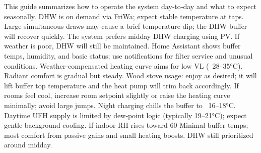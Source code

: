 \markdownRendererDocumentBegin
\markdownRendererSectionBegin
{}\markdownRendererInterblockSeparator
{}This guide summarizes how to operate the system day‑to‑day and what to expect seasonally.\markdownRendererInterblockSeparator
{}\markdownRendererSectionBegin
{}\markdownRendererInterblockSeparator
{}\markdownRendererUlBeginTight
\markdownRendererUlItem DHW is on demand via FriWa; expect stable temperature at taps. Large simultaneous draws may cause a brief temperature dip; the DHW buffer will recover quickly.\markdownRendererUlItemEnd 
\markdownRendererUlItem The system prefers midday DHW charging using PV. If weather is poor, DHW will still be maintained.\markdownRendererUlItemEnd 
\markdownRendererUlItem Home Assistant shows buffer temps, humidity, and basic status; use notifications for filter service and unusual conditions.\markdownRendererUlItemEnd 
\markdownRendererUlEndTight \markdownRendererInterblockSeparator
{}
\markdownRendererSectionEnd \markdownRendererSectionBegin
{}\markdownRendererInterblockSeparator
{}\markdownRendererUlBeginTight
\markdownRendererUlItem Weather‑compensated heating curve aims for low VL (~28–35°C). Radiant comfort is gradual but steady.\markdownRendererUlItemEnd 
\markdownRendererUlItem Wood stove usage: enjoy as desired; it will lift buffer top temperature and the heat pump will trim back accordingly.\markdownRendererUlItemEnd 
\markdownRendererUlItem If rooms feel cool, increase room setpoint slightly or raise the heating curve minimally; avoid large jumps.\markdownRendererUlItemEnd 
\markdownRendererUlEndTight \markdownRendererInterblockSeparator
{}
\markdownRendererSectionEnd \markdownRendererSectionBegin
{}\markdownRendererInterblockSeparator
{}\markdownRendererUlBeginTight
\markdownRendererUlItem Night charging chills the buffer to ~16–18°C. Daytime UFH supply is limited by dew‑point logic (typically 19–21°C); expect gentle background cooling.\markdownRendererUlItemEnd 
\markdownRendererUlItem If indoor RH rises toward 60\markdownRendererUlItemEnd 
\markdownRendererUlEndTight \markdownRendererInterblockSeparator
{}
\markdownRendererSectionEnd \markdownRendererSectionBegin
{}\markdownRendererInterblockSeparator
{}\markdownRendererUlBeginTight
\markdownRendererUlItem Minimal buffer temps; most comfort from passive gains and small heating boosts. DHW still prioritized around midday.\markdownRendererUlItemEnd 
